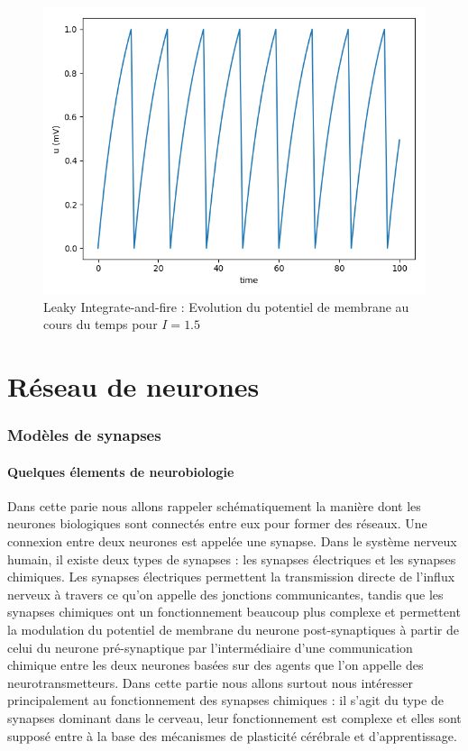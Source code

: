 \documentclass[12pt]{scrartcl}
\begin{document}
\begin{figure}[!h]
\centering
\includegraphics[scale=0.5]{imgs/liaf.png}
\caption{Leaky Integrate-and-fire : Evolution du potentiel de membrane au cours du temps pour $I = 1.5$}
\label{liaf}
\end{figure}

\pagebreak

\part{Réseau de neurones}

\section{Modèles de synapses}

\subsection{Quelques élements de neurobiologie}
Dans cette parie nous allons rappeler schématiquement la manière dont les neurones biologiques sont connectés entre eux pour former des réseaux. Une connexion entre deux neurones est appelée une synapse. Dans le système nerveux humain, il existe deux types de synapses : les synapses électriques et les synapses chimiques. Les synapses électriques permettent la transmission directe de l'influx nerveux à travers ce qu'on appelle des jonctions communicantes, tandis que les synapses chimiques ont un fonctionnement beaucoup plus complexe et permettent la modulation du potentiel de membrane du neurone post-synaptiques à partir de celui du neurone pré-synaptique par l'intermédiaire d'une communication chimique entre les deux neurones basées sur des agents que l'on appelle des neurotransmetteurs. Dans cette partie nous allons surtout nous intéresser principalement au fonctionnement des synapses chimiques : il s'agit du type de synapses dominant dans le cerveau, leur fonctionnement est complexe et elles sont supposé entre à la base des mécanismes de plasticité cérébrale et d'apprentissage.\\
\end{document}

